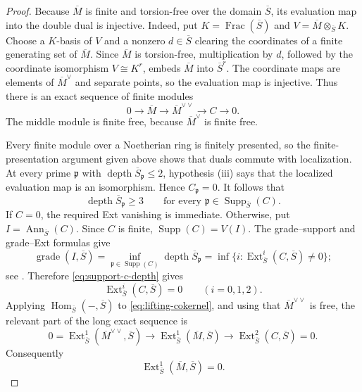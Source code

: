 \documentclass[reqno]{amsart}
\theoremstyle{plain}
\theoremstyle{definition}
\newcommand{\Supp}{\operatorname{Supp}}
\newcommand{\depth}{\operatorname{depth}}
\newcommand{\Ext}{\operatorname{Ext}}
\newcommand{\Hom}{\operatorname{Hom}}
\newcommand{\Frac}{\operatorname{Frac}}
\begin{document}
\begin{proof}
Because $\overline M$ is finite and torsion-free over the domain
$\overline S$, its evaluation map into the double dual is injective.  Indeed,
put $K=\Frac(\overline S)$ and
$V=\overline M\otimes_{\overline S}K$.  Choose a $K$-basis of $V$ and a
nonzero $d\in\overline S$ clearing the coordinates of a finite generating
set of $\overline M$.  Since $\overline M$ is torsion-free, multiplication by
$d$, followed by the coordinate isomorphism $V\cong K^r$, embeds
$\overline M$ into $\overline S^r$.  The coordinate maps are elements of
$\overline M^\vee$ and separate points, so the evaluation map is injective.
Thus there is an exact sequence of finite modules
\begin{equation}
\label{eq:lifting-cokernel}
  0\longrightarrow\overline M
   \longrightarrow\overline M^{\vee\vee}
   \longrightarrow C\longrightarrow0.
\end{equation}
The middle module is finite free, because $\overline M^\vee$ is finite
free.

Every finite module over a Noetherian ring is finitely presented, so the
finite-presentation argument given above shows that duals commute with
localization.  At every prime
$\mathfrak p$ with
$\depth\overline S_{\mathfrak p}\leq2$, hypothesis (iii) says that the
localized evaluation map is an isomorphism.  Hence $C_{\mathfrak p}=0$.
It follows that
\begin{equation}
\label{eq:support-c-depth}
 \depth\overline S_{\mathfrak p}\geq3
 \qquad\text{for every }\mathfrak p\in\Supp_{\overline S}(C).
\end{equation}
If $C=0$, the required Ext vanishing is immediate.  Otherwise, put
$I=\operatorname{Ann}_{\overline S}(C)$.  Since $C$ is finite,
$\Supp(C)=V(I)$.  The grade--support and grade--Ext formulas give
\[
 \operatorname{grade}(I,\overline S)
 =\inf_{\mathfrak p\in\Supp(C)}
     \depth\overline S_{\mathfrak p}
 =\inf\{i:\Ext^i_{\overline S}(C,\overline S)\neq0\};
\]
see \cite[Proposition~1.2.10(a),(e)]{BrunsHerzog}.  Therefore
\eqref{eq:support-c-depth} gives
\[
 \Ext^i_{\overline S}(C,\overline S)=0
 \qquad (i=0,1,2).
\]
Applying $\Hom_{\overline S}(-,\overline S)$ to
\eqref{eq:lifting-cokernel}, and using that
$\overline M^{\vee\vee}$ is free, the relevant part of the long exact
sequence is
\[
 0=\Ext^1_{\overline S}
       (\overline M^{\vee\vee},\overline S)
 \longrightarrow
 \Ext^1_{\overline S}(\overline M,\overline S)
 \longrightarrow
 \Ext^2_{\overline S}(C,\overline S)=0.
\]
Consequently
\[
 \Ext^1_{\overline S}(\overline M,\overline S)=0.
\]


\end{proof}
\end{document}
